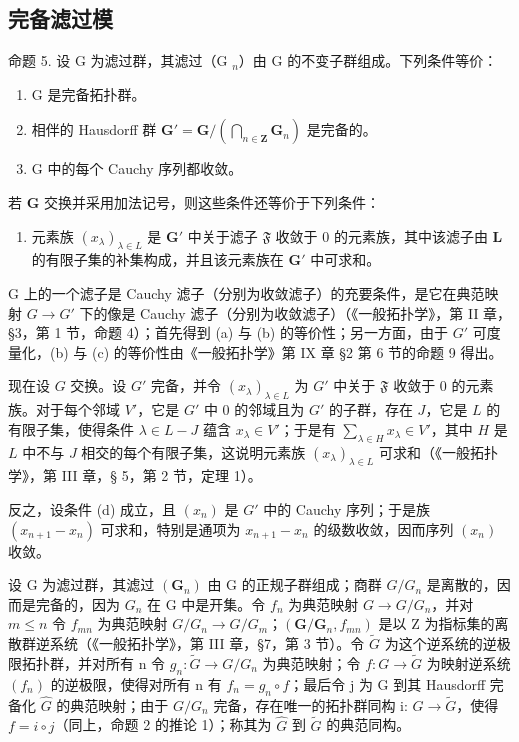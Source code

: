 \subsection{完备滤过模}

命题 5. 设 G 为滤过群，其滤过（G \(_{n}\)）由 G 的不变子群组成。下列条件等价：

\begin{enumerate}
\def\labelenumi{(\alph{enumi})}
\item
  G 是完备拓扑群。
\item
  相伴的 Hausdorff 群 \(\mathbf{G}' = \mathbf{G} / \left(\bigcap_{n\in \mathbf{Z}}\mathbf{G}_n\right)\) 是完备的。
\item
  G 中的每个 Cauchy 序列都收敛。
\end{enumerate}

若 \(\mathbf{G}\) 交换并采用加法记号，则这些条件还等价于下列条件：

\begin{enumerate}
\def\labelenumi{(\alph{enumi})}
\setcounter{enumi}{3}
\tightlist
\item
	元素族 \((x_{\lambda})_{\lambda \in L}\) 是 \(\mathbf{G}'\) 中关于滤子 \(\mathfrak{F}\) 收敛于 0 的元素族，其中该滤子由 \(\mathbf{L}\) 的有限子集的补集构成，并且该元素族在 \(\mathbf{G}'\) 中可求和。
\end{enumerate}

G 上的一个滤子是 Cauchy 滤子（分别为收敛滤子）的充要条件，是它在典范映射 \(G \rightarrow G'\) 下的像是 Cauchy 滤子（分别为收敛滤子）（《一般拓扑学》，第 II 章，§3，第 1 节，命题 4）；首先得到 (a) 与 (b) 的等价性；另一方面，由于 \(G'\) 可度量化，(b) 与 (c) 的等价性由《一般拓扑学》第 IX 章 §2 第 6 节的命题 9 得出。

	现在设 \(G\) 交换。设 \(G'\) 完备，并令 \((x_{\lambda})_{\lambda \in L}\) 为 \(G'\) 中关于 \(\mathfrak{F}\) 收敛于 0 的元素族。对于每个邻域 \(V'\)，它是 \(G'\) 中 0 的邻域且为 \(G'\) 的子群，存在 \(J\)，它是 \(L\) 的有限子集，使得条件 \(\lambda \in L - J\) 蕴含 \(x_{\lambda} \in V'\)；于是有 \(\sum_{\lambda \in H} x_{\lambda} \in V'\)，其中 \(H\) 是 \(L\) 中不与 \(J\) 相交的每个有限子集，这说明元素族 \((x_{\lambda})_{\lambda \in L}\) 可求和（《一般拓扑学》，第 III 章，§ 5，第 2 节，定理 1）。

反之，设条件 (d) 成立，且 \((x_{n})\) 是 \(G'\) 中的 Cauchy 序列；于是族 \((x_{n+1} - x_{n})\) 可求和，特别是通项为 \(x_{n+1} - x_{n}\) 的级数收敛，因而序列 \((x_{n})\) 收敛。

设 G 为滤过群，其滤过 \((\mathbf{G}_{n})\) 由 G 的正规子群组成；商群 \(G/G_{n}\) 是离散的，因而是完备的，因为 \(G_{n}\) 在 G 中是开集。令 \(f_{n}\) 为典范映射 \(G \to G/G_{n}\)，并对 \(m \leqslant n\) 令 \(f_{mn}\) 为典范映射 \(G/G_{n} \to G/G_{m}\)；\((\mathbf{G}/\mathbf{G}_{n}, f_{mn})\) 是以 Z 为指标集的离散群逆系统（《一般拓扑学》，第 III 章，§7，第 3 节）。令 \(\tilde{G}\) 为这个逆系统的逆极限拓扑群，并对所有 n 令 \(g_{n}: \tilde{G} \to G/G_{n}\) 为典范映射；令 \(f: G \to \tilde{G}\) 为映射逆系统 \((f_{n})\) 的逆极限，使得对所有 n 有 \(f_{n} = g_{n} \circ f\)；最后令 j 为 G 到其 Hausdorff 完备化 \(\hat{G}\) 的典范映射；由于 \(G/G_{n}\) 完备，存在唯一的拓扑群同构 i: \(\hat{G} \to \tilde{G}\)，使得 \(f = i \circ j\)（同上，命题 2 的推论 1）；称其为 \(\hat{G}\) 到 \(\tilde{G}\) 的典范同构。

